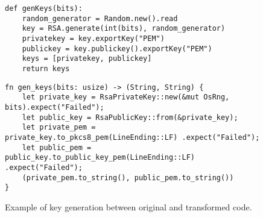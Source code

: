 \begin{figure}[htb]
    \centering
    \begin{minipage}{.48\textwidth}
\begin{tcolorbox}[colback=gray!5!white, colframe=cyan!40!black, boxsep=2pt, top=1mm, bottom=1mm, left=0pt, right=0pt, title=\centering{Original code}]
\begin{verbatim}
def genKeys(bits):
    random_generator = Random.new().read
    key = RSA.generate(int(bits), random_generator)
    privatekey = key.exportKey("PEM")
    publickey = key.publickey().exportKey("PEM")
    keys = [privatekey, publickey]
    return keys
\end{verbatim}
\end{tcolorbox}
\end{minipage}%
\vspace{1em} %
\begin{minipage}{.48\textwidth}
\centering
\begin{tcolorbox}[colback=gray!5!white, colframe=cyan!40!black, boxsep=2pt, top=1mm, bottom=1mm, left=0pt, right=0pt, title=\centering{Transformed code}]
\begin{verbatim}
fn gen_keys(bits: usize) -> (String, String) {
    let private_key = RsaPrivateKey::new(&mut OsRng, bits).expect("Failed");
    let public_key = RsaPublicKey::from(&private_key);
    let private_pem = private_key.to_pkcs8_pem(LineEnding::LF) .expect("Failed");
    let public_pem = public_key.to_public_key_pem(LineEnding::LF) .expect("Failed");
    (private_pem.to_string(), public_pem.to_string())
}
\end{verbatim}
\end{tcolorbox}
\end{minipage}
\caption{Example of key generation between original and transformed code.}
\label{code:eva:key_case}
\end{figure}

